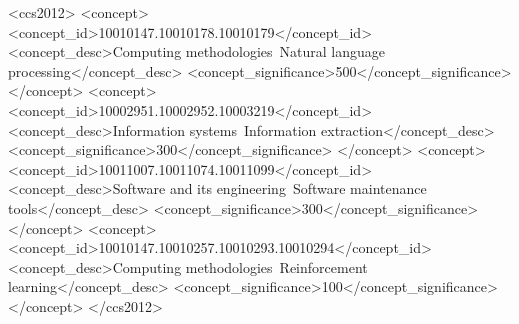 \documentclass[sigconf, anonymous]{acmart}
\begin{document}
\begin{abstract}
  from 0.163 to 0.592, and type routing reaches 0.96 template-fill against 0.69 without it, which
  is a schema-conformance measure rather than a quality one. The specifications score $3.94/5$ on
  a five-dimension rubric over all 100 specs.
  We also report a result we withdraw. An earlier version of this work found that supplying the
  typed specification to a response generator raised human-rated reply quality by $+2.35$ Likert
  points. That comparison was confounded: its two arms came from different deterministic template
  composers rather than from one model. Re-run with the generator held fixed and three raters
  scoring 200 blinded rows, the gain is $+0.04$ ($p = 0.54$), and the raters disagree in
  direction. Three further components of our own pipeline also fail their tests, and we report
  each rather than removing it. We release the IssueSpec schema, the benchmark dataset, the
  \textsc{SpecCov} scorer together with the validation showing it does not track human
  faithfulness judgements, the verified-anchor resource, both rating rounds, and a CMDP-based
  RLHF testbed.
  \end{abstract}
\begin{CCSXML}
<ccs2012>
  <concept>
    <concept_id>10010147.10010178.10010179</concept_id>
    <concept_desc>Computing methodologies~Natural language processing</concept_desc>
    <concept_significance>500</concept_significance>
  </concept>
  <concept>
    <concept_id>10002951.10002952.10003219</concept_id>
    <concept_desc>Information systems~Information extraction</concept_desc>
    <concept_significance>300</concept_significance>
  </concept>
  <concept>
    <concept_id>10011007.10011074.10011099</concept_id>
    <concept_desc>Software and its engineering~Software maintenance tools</concept_desc>
    <concept_significance>300</concept_significance>
  </concept>
  <concept>
    <concept_id>10010147.10010257.10010293.10010294</concept_id>
    <concept_desc>Computing methodologies~Reinforcement learning</concept_desc>
    <concept_significance>100</concept_significance>
  </concept>
</ccs2012>
\end{CCSXML}


\end{document}
